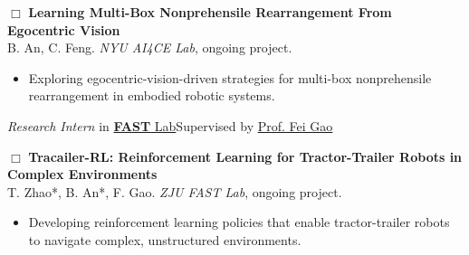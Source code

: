 \documentclass{resume}
\begin{document}
        \begin{adjustwidth}{0.2em}{0em}
            \(\Box\) \textbf{Learning Multi-Box Nonprehensile Rearrangement From Egocentric Vision}\\
            {\small B. An, C. Feng. \textit{NYU AI4CE Lab}, ongoing project.}
        \end{adjustwidth}
        \begin{adjustwidth}{1.2em}{0em}
            \begin{itemize}
                \item Exploring egocentric-vision-driven strategies for multi-box nonprehensile rearrangement in embodied robotic systems.
            \end{itemize}
        \end{adjustwidth}

    \textit{Research Intern} {in \href{http://zju-fast.com/research-group/fei-gao/}{\textbf{FAST} 
    Lab}\hfill Supervised by \href{https://scholar.google.com/citations?hl=en&user=4RObDv0AAAAJ}{Prof. Fei Gao}}
    
        \begin{adjustwidth}{0.2em}{0em}
            \(\Box\) \textbf{Tracailer-RL: Reinforcement Learning for Tractor-Trailer Robots in Complex Environments}\\
            {\small T. Zhao*, B. An*, F. Gao. \textit{ZJU FAST Lab}, ongoing project.}
        \end{adjustwidth}
        \begin{adjustwidth}{1.2em}{0em}
            \begin{itemize}
                \item Developing reinforcement learning policies that enable tractor-trailer robots to navigate complex, unstructured environments.
            \end{itemize}
        \end{adjustwidth}
\end{document}
